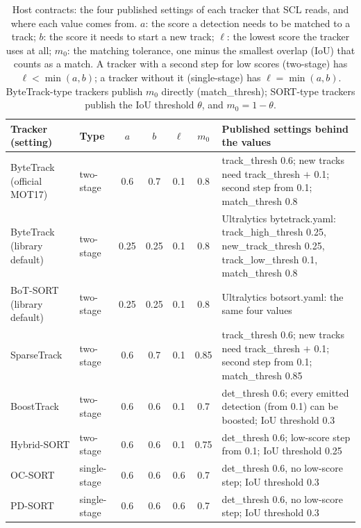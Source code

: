 \documentclass[pdflatex,sn-mathphys-num,iicol]{sn-jnl}
\newcommand{\scl}{SCL}
\begin{document}
\begin{table}[!t]
\caption{Host contracts: the four published settings of each tracker that \scl{} reads, and where
each value comes from. $a$: the score a detection needs to be matched to a track; $b$: the score it
needs to start a new track; $\ell$: the lowest score the tracker uses at all; $m_0$: the matching
tolerance, one minus the smallest overlap (IoU) that counts as a match. A tracker with a second
step for low scores (two-stage) has $\ell<\min(a,b)$; a tracker without it (single-stage) has
$\ell=\min(a,b)$. ByteTrack-type trackers publish $m_0$ directly (match\_thresh); SORT-type
trackers publish the IoU threshold $\theta$, and $m_0=1-\theta$.}
\label{tab:contracts}
\centering\footnotesize
\setlength{\tabcolsep}{4pt}
\begin{tabular}{@{}>{\raggedright\arraybackslash}p{30mm}lcccc>{\raggedright\arraybackslash}p{78mm}@{}}
\toprule
Tracker (setting) & Type & $a$ & $b$ & $\ell$ & $m_0$ & Published settings behind the values\\
\midrule
ByteTrack (official MOT17) & two-stage & 0.6 & 0.7 & 0.1 & 0.8 & track\_thresh 0.6; new tracks need track\_thresh $+$ 0.1; second step from 0.1; match\_thresh 0.8\\
ByteTrack (library default) & two-stage & 0.25 & 0.25 & 0.1 & 0.8 & Ultralytics bytetrack.yaml: track\_high\_thresh 0.25, new\_track\_thresh 0.25, track\_low\_thresh 0.1, match\_thresh 0.8\\
BoT-SORT (library default) & two-stage & 0.25 & 0.25 & 0.1 & 0.8 & Ultralytics botsort.yaml: the same four values\\
SparseTrack & two-stage & 0.6 & 0.7 & 0.1 & 0.85 & track\_thresh 0.6; new tracks need track\_thresh $+$ 0.1; second step from 0.1; match\_thresh 0.85\\
BoostTrack & two-stage & 0.6 & 0.6 & 0.1 & 0.7 & det\_thresh 0.6; every emitted detection (from 0.1) can be boosted; IoU threshold 0.3\\
Hybrid-SORT & two-stage & 0.6 & 0.6 & 0.1 & 0.75 & det\_thresh 0.6; low-score step from 0.1; IoU threshold 0.25\\
OC-SORT & single-stage & 0.6 & 0.6 & 0.6 & 0.7 & det\_thresh 0.6, no low-score step; IoU threshold 0.3\\
PD-SORT & single-stage & 0.6 & 0.6 & 0.6 & 0.7 & det\_thresh 0.6, no low-score step; IoU threshold 0.3\\
\bottomrule
\end{tabular}
\end{table}
\end{document}
